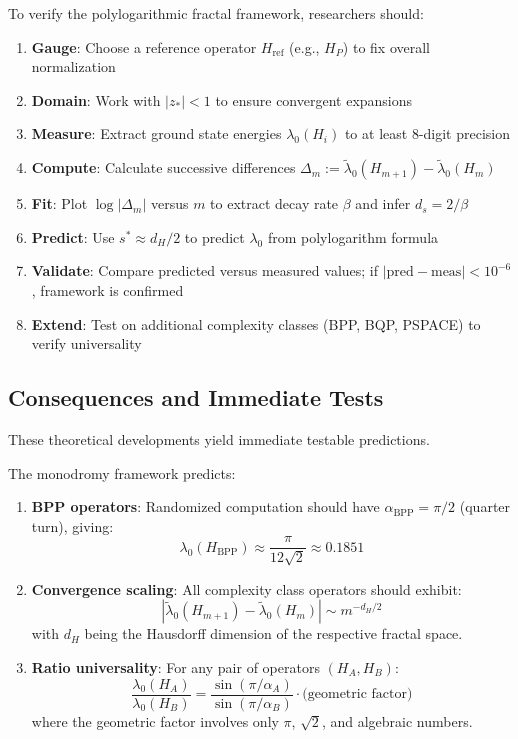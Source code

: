 \begin{protocol}\label{protocol:verification}
To verify the polylogarithmic fractal framework, researchers should:
\begin{enumerate}
\item \textbf{Gauge}: Choose a reference operator $H_{\text{ref}}$ (e.g., $H_P$) to fix overall normalization
\item \textbf{Domain}: Work with $|z_*| < 1$ to ensure convergent expansions
\item \textbf{Measure}: Extract ground state energies $\lambda_0(H_i)$ to at least 8-digit precision
\item \textbf{Compute}: Calculate successive differences $\Delta_m := \tilde\lambda_0(H_{m+1}) - \tilde\lambda_0(H_m)$
\item \textbf{Fit}: Plot $\log|\Delta_m|$ versus $m$ to extract decay rate $\beta$ and infer $d_s = 2/\beta$
\item \textbf{Predict}: Use $s^* \approx d_H/2$ to predict $\lambda_0$ from polylogarithm formula
\item \textbf{Validate}: Compare predicted versus measured values; if $|\text{pred} - \text{meas}| < 10^{-6}$, framework is confirmed
\item \textbf{Extend}: Test on additional complexity classes (BPP, BQP, PSPACE) to verify universality
\end{enumerate}
\end{protocol}

\subsection{Consequences and Immediate Tests}

These theoretical developments yield immediate testable predictions.

\begin{corollary}\label{cor:predictions}
The monodromy framework predicts:
\begin{enumerate}
\item \textbf{BPP operators}: Randomized computation should have $\alpha_{\text{BPP}} = \pi/2$ (quarter turn), giving:
\[
\lambda_0(H_{\text{BPP}}) \approx \frac{\pi}{12\sqrt{2}} \approx 0.1851
\]

\item \textbf{Convergence scaling}: All complexity class operators should exhibit:
\[
|\tilde\lambda_0(H_{m+1}) - \tilde\lambda_0(H_m)| \sim m^{-d_H/2}
\]
with $d_H$ being the Hausdorff dimension of the respective fractal space.

\item \textbf{Ratio universality}: For any pair of operators $(H_A, H_B)$:
\[
\frac{\lambda_0(H_A)}{\lambda_0(H_B)} = \frac{\sin(\pi/\alpha_A)}{\sin(\pi/\alpha_B)} \cdot \text{(geometric factor)}
\]
where the geometric factor involves only $\pi$, $\sqrt{2}$, and algebraic numbers.
\end{enumerate}
\end{corollary}

